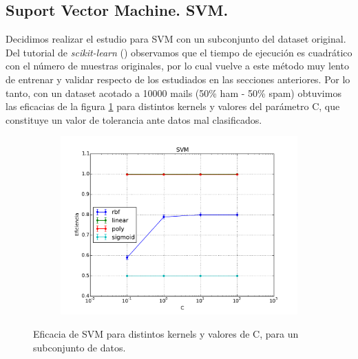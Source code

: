 \documentclass[a4paper,10pt]{article}
\begin{document}
\subsection{Suport Vector Machine. SVM.}

\par Decidimos realizar el estudio para SVM con un subconjunto del dataset original. Del tutorial de \emph{scikit-learn} (\cite{sklearn}) observamos que el tiempo de ejecución es cuadrático con el número de muestras originales, por lo cual vuelve a este método muy lento de entrenar y validar respecto de los estudiados en las secciones anteriores. Por lo tanto, con un dataset acotado a 10000 mails (50\% ham - 50\% spam) obtuvimos las eficacias de la figura \ref{fig:svm} para distintos kernels y valores del parámetro C, que constituye un valor de tolerancia ante datos mal clasificados.

\begin{figure}[H]
  \centering
  \begin{subfigure}[b]{0.4\textwidth}
    \includegraphics[width=\textwidth]{../imagenes/SVM}
    
  \end{subfigure}
    \caption{Eficacia de SVM para distintos kernels y valores de C, para un subconjunto de datos.}
  \label{fig:svm}
\end{figure}
\end{document}
